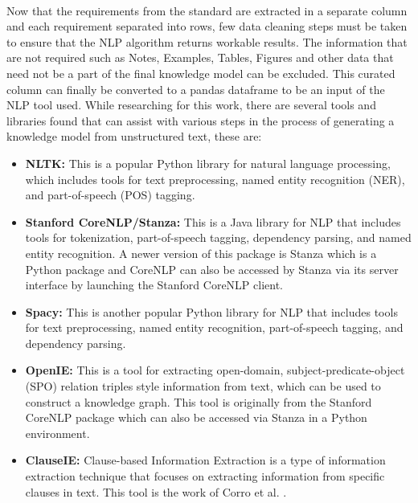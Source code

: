 \paragraph{} Now that the requirements from the standard are extracted in a separate column and each requirement separated into rows, few data cleaning steps must be taken to ensure that the NLP algorithm returns workable results. The information that are not required such as Notes, Examples, Tables, Figures and other data that need not be a part of the final knowledge model can be excluded. This curated column can finally be converted to a pandas dataframe to be an input of the NLP tool used. While researching for this work, there are several tools and libraries found that can assist with various steps in the process of generating a knowledge model from unstructured text, these are:
\begin{itemize}
    \item \textbf{NLTK:} This is a popular Python library for natural language processing, which includes tools for text preprocessing, named entity recognition (NER), and part-of-speech (POS) tagging.
    \item \textbf{Stanford CoreNLP/Stanza:} This is a Java library for NLP that includes tools for tokenization, part-of-speech tagging, dependency parsing, and named entity recognition. A newer version of this package is Stanza which is a Python package and CoreNLP can also be accessed by Stanza via its server interface by launching the Stanford CoreNLP client. 
    \item \textbf{Spacy:} This is another popular Python library for NLP that includes tools for text preprocessing, named entity recognition, part-of-speech tagging, and dependency parsing.
    \item \textbf{OpenIE:} This is a tool for extracting open-domain, subject-predicate-object (SPO) relation triples style information from text, which can be used to construct a knowledge graph. This tool is originally from the Stanford CoreNLP package which can also be accessed via Stanza in a Python environment.
    \item \textbf{ClauseIE:} Clause-based Information Extraction is a type of information extraction technique that focuses on extracting information from specific clauses in text. This tool is the work of Corro et al. \cite{Corro2013}.
\end{itemize}

